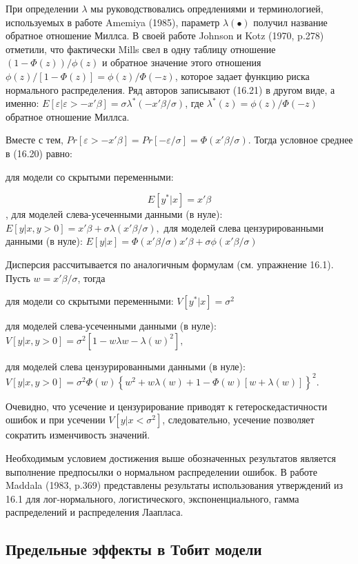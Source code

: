 При определении $\lambda$ мы руководствовались опредлениями и терминологией, используемых в работе Amemiya (1985), параметр $\lambda(\bullet)$ получил название обратное отношение Миллса. В своей работе Johnson и Kotz (1970, p.278) отметили, что фактически Mills свел в одну таблицу отношение $(1-\Phi(z))/\phi(z)$ и обратное значение этого отношения $\phi(z)/[1-\Phi(z)]=\phi(z)/\Phi(-z)$, которое задает функцию риска нормального распределения. Ряд авторов записывают (16.21) в другом виде, а именно: $E[\varepsilon|\varepsilon>-x'\beta]=\sigma\lambda^{*}(-x'\beta/\sigma)$, где $\lambda^{*}(z)=\phi(z)/\Phi(-z)$ обратное отношение Миллса.

Вместе с тем, $Pr[\varepsilon>-x'\beta]=Pr[-\varepsilon/\sigma]=\Phi(x'\beta/\sigma)$. Тогда условное среднее в (16.20) равно:

для модели со скрытыми переменными: 

\begin{equation}
E[y^{*}|x]=x'\beta
\end{equation},
для моделей слева-усеченными данными (в нуле): $E[y|x,y>0]=x'\beta+\sigma\lambda(x'\beta/\sigma),$
для моделей слева цензурированными данными (в нуле): $E[y|x]=\Phi(x'\beta/\sigma)x'\beta+\sigma\phi(x'\beta/\sigma)$

Дисперсия рассчитывается по аналогичным формулам (см. упражнение 16.1). Пусть $w=x'\beta/\sigma$, тогда 

для модели со скрытыми переменными: $V[y^{*}|x]=\sigma^2$

для моделей слева-усеченными данными (в нуле): $V[y|x,y>0]=\sigma^2[1-w\lambda{w}-\lambda(w)^2],$

для моделей слева цензурированными данными (в нуле): $V[y|x,y>0]={\sigma}^2\Phi(w)\left\lbrace  w^2+w\lambda(w)+1-\Phi(w)[w+\lambda(w)]\right\rbrace^2$.

Очевидно, что усечение и цензурирование приводят к гетероскедастичности ошибок и при усечении $V[y|x<\sigma^2]$, следовательно, усечение позволяет сократить изменчивость значений.

Необходимым условием достижения выше обозначенных результатов является выполнение предпосылки о нормальном распределении ошибок. В работе Maddala (1983, p.369) представлены результаты использования утверждений из 16.1 для лог-нормального, логистического, экспоненциального, гамма распределений и распределения Лаапласа.

\subsection{Предельные эффекты в Тобит модели}

